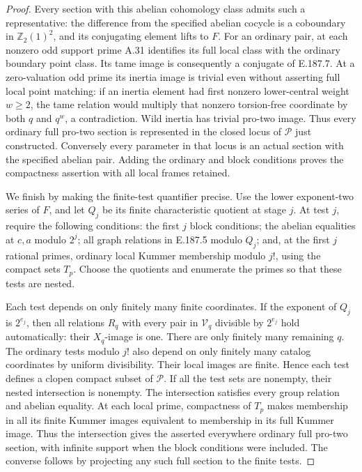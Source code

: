 \begin{proof}
Every section with this abelian cohomology class admits
such a representative: the difference from the specified
abelian cocycle is a coboundary in \(\mathbb Z_2(1)^2\),
and its conjugating element lifts to \(F\).
For an ordinary pair, at each nonzero odd support prime
A.31 identifies its full local class with the ordinary
boundary point class. Its tame image is consequently a
conjugate of E.187.7. At a zero-valuation odd prime its
inertia image is trivial even without asserting full
local point matching: if an inertia element had first
nonzero lower-central weight \(w\geq2\), the tame
relation would multiply that nonzero torsion-free
coordinate by both \(q\) and \(q^w\), a contradiction.
Wild inertia has trivial pro-two image. Thus every
ordinary full pro-two section is represented in the
closed locus of \(\mathcal P\) just constructed.
Conversely every parameter in that locus is an actual
section with the specified abelian pair. Adding the
ordinary and block conditions proves the compactness
assertion with all local frames retained.

We finish by making the finite-test quantifier precise.
Use the lower exponent-two series of \(F\), and let
\(Q_j\) be its finite characteristic quotient at stage
\(j\). At test \(j\), require the following conditions:
the first \(j\) block conditions; the abelian equalities
at \(c,a\) modulo \(2^j\); all graph relations in
E.187.5 modulo \(Q_j\); and, at the first \(j\)
rational primes, ordinary local Kummer membership
modulo \(j!\), using the compact sets \(T_p\).
Choose the quotients and enumerate the primes so that
these tests are nested.

Each test depends on only finitely many finite coordinates.
If the exponent of \(Q_j\) is \(2^{e_j}\), then all
relations \(R_q\) with every pair in \(\mathcal V_q\)
divisible by \(2^{e_j}\) hold automatically: their
\(X_q\)-image is one. There are only finitely many
remaining \(q\). The ordinary tests modulo \(j!\)
also depend on only finitely many catalog coordinates
by uniform divisibility. Their local images are finite.
Hence each test defines a clopen compact subset of
\(\mathcal P\). If all the test sets are nonempty,
their nested intersection is nonempty. The intersection
satisfies every group relation and abelian equality.
At each local prime, compactness of \(T_p\) makes
membership in all its finite Kummer images equivalent
to membership in its full Kummer image. Thus the
intersection gives the asserted everywhere ordinary
full pro-two section, with infinite support when the
block conditions were included. The converse follows
by projecting any such full section to the finite tests.


\end{proof}
